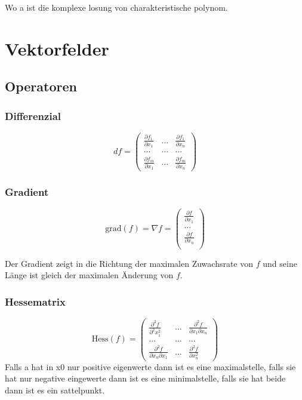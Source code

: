 \documentclass[11pt]{article}
\begin{document}
Wo a ist die komplexe losung von charakteristische polynom.

\section{Vektorfelder}

\subsection{Operatoren}

\subsubsection{Differenzial}

\begin{equation*}
	df = \begin{pmatrix}
		\frac{\partial f_1}{\partial x_1} & ... & \frac{\partial f_1}{\partial x_n} \\
		... & ... & ... \\
		\frac{\partial f_m}{\partial x_1} & ... & \frac{\partial f_m}{\partial x_n}
	\end{pmatrix}
\end{equation*}

\subsubsection{Gradient}

\begin{equation*}
	\text{grad}(f)=\nabla f=
	\begin{pmatrix}
		\frac{\partial f}{\partial x_1}\\
		...\\
		\frac{\partial f}{\partial x_n}\\
	\end{pmatrix}
\end{equation*}

Der Gradient zeigt in die Richtung der maximalen Zuwachsrate von $f$ und seine Länge ist gleich der maximalen Änderung von $f$.

\subsubsection{Hessematrix}

\begin{equation*}
	\text{Hess}(f)=
	\begin{pmatrix}
		\frac{\partial^2 f}{\partial^2x_1^2} & ... & \frac{\partial^2 f}{\partial x_1 \partial x_n}\\
		...&...&...\\
		\frac{\partial^2 f}{\partial x_n \partial x_1} & ... & \frac{\partial^2 f}{\partial x_n^2}
	\end{pmatrix}
\end{equation*}
Falls a hat in x0 nur positive eigenwerte dann ist es eine maximalstelle, falls sie hat nur negative eingewerte dann ist es eine minimalstelle, falls sie hat beide dann ist es ein sattelpunkt.
\end{document}
